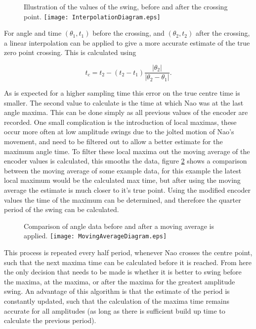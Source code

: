 \documentclass[11pt]{article}
\begin{document}
    \begin{figure}[!htb]
        \centering
        \captionbox
             {Illustration of the values of the swing, before and after the crossing point.\label{InterpolationDiagram}}
             {\texttt{[image: InterpolationDiagram.eps]}}
    \end{figure}

For angle and time $(\theta_1, t_1)$ before the crossing, and $(\theta_2, t_2)$ after the crossing, a linear interpolation can be applied to give a more accurate estimate of the true zero point crossing. This is calculated using

\begin{equation}
    t_c = t_2 - (t_2 - t_1) \frac{|\theta_2|}{|\theta_2 - \theta_1|}.
\end{equation}

As is expected for a higher sampling time this error on the true centre time is smaller. The second value to calculate is the time at which Nao was at the last angle maxima. This can be done simply as all previous values of the encoder are recorded. One small complication is the introduction of local maximas, these occur more often at low amplitude swings due to the jolted motion of Nao's movement, and need to be filtered out to allow a better estimate for the maximum angle time. To filter these local maxima out the moving average of the encoder values is calculated, this smooths the data, figure \ref{MovingAverageDiagram} shows a comparison between the moving average of some example data, for this example the latest local maximum would be the calculated max time, but after using the moving average the estimate is much closer to it's true point. Using the modified encoder values the time of the maximum can be determined, and therefore the quarter period of the swing can be calculated. \\

    \begin{figure}[!htb]
        \centering
        \captionbox
             {Comparison of angle data before and after a moving average is applied.\label{MovingAverageDiagram}}
             {\texttt{[image: MovingAverageDiagram.eps]}}
    \end{figure}


This process is repeated every half period, whenever Nao crosses the centre point, such that the next maxima time can be calculated before it is reached. From here the only decision that needs to be made is whether it is better to swing before the maxima, at the maxima, or after the maxima for the greatest amplitude swing. An advantage of this algorithm is that the estimate of the period is constantly updated, such that the calculation of the maxima time remains accurate for all amplitudes (as long as there is sufficient build up time to calculate the previous period).
\end{document}
